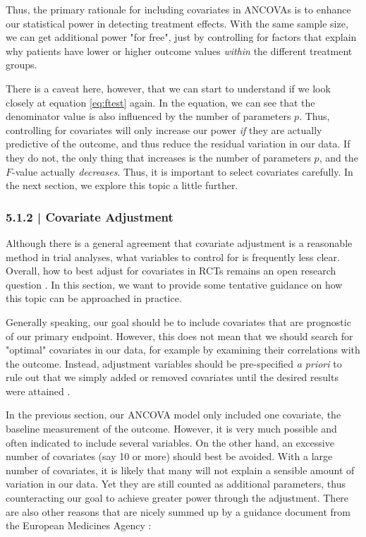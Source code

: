 Thus, the primary rationale for including covariates in ANCOVAs is to enhance our statistical power in detecting treatment effects. With the same sample size, we can get additional power "for free", just by controlling for factors that explain why patients have lower or higher outcome values \emph{within} the different treatment groups. 

There is a caveat here, however, that we can start to understand if we look closely at equation \ref{eq:ftest} again. In the equation, we can see that the denominator value is also influenced by the number of parameters $p$. Thus, controlling for covariates will only increase our power \emph{if} they are actually predictive of the outcome, and thus reduce the residual variation in our data. If they do not, the only thing that increases is the number of parameters $p$, and the $F$-value actually \emph{decreases}. Thus, it is important to select covariates carefully. In the next section, we explore this topic a little further. 

\subsubsection{{\normalfont\textsf{\textcolor{sBlue}{\small 5.1.2 |}}} Covariate Adjustment}

Although there is a general agreement that covariate adjustment is a reasonable method in trial analyses, what variables to control for is frequently less clear. Overall, how to best adjust for covariates in RCTs remains an open research question \citep{permutt2020covariates, kahan2014risks, kahan2016comparison, tackney2023comparison, morris2022planning}. In this section, we want to provide some tentative guidance on how this topic can be approached in practice. 

Generally speaking, our goal should be to include covariates that are prognostic of our primary endpoint. However, this does not mean that we should search for "optimal" covariates in our data, for example by examining their correlations with the outcome. Instead, adjustment variables should be pre-specified \emph{a priori} to rule out that we simply added or removed covariates until the desired results were attained \citep{assmann2000subgroup}. 

In the previous section, our ANCOVA model only included one covariate, the baseline measurement of the outcome. However, it is very much possible and often indicated to include several variables. On the other hand, an excessive number of covariates (say 10 or more) should best be avoided. With a large number of covariates, it is likely that many will not explain a sensible amount of variation in our data. Yet they are still counted as additional parameters, thus counteracting our goal to achieve greater power through the adjustment. There are also other reasons that are nicely summed up by a guidance document from the European Medicines Agency \citep{ema}:

